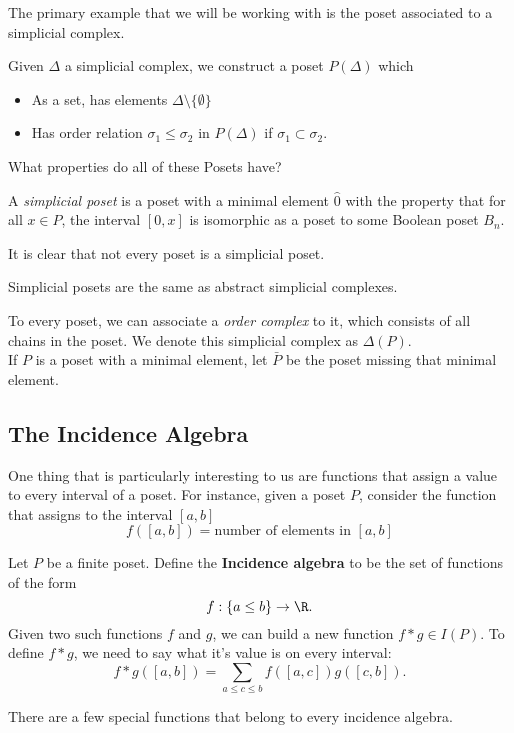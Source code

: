 The primary example that we will be working with is the poset associated to a simplicial complex.
\begin{definition}
 Given $\Delta$ a simplicial complex, we construct a poset $P(\Delta)$ which
 \begin{itemize}
 \item As a set, has elements $\Delta\setminus\{\emptyset\}$
 \item Has order relation  $\sigma_1\leq \sigma_2$ in $P(\Delta)$ if $\sigma_1\subset \sigma_2$. 
 \end{itemize}
\end{definition}

What properties do all of these Posets have?
\begin{definition}
 A \emph{simplicial poset} is a poset with a minimal element $\hat 0$ with the property that for all $x\in P$, the interval $[0, x]$ is isomorphic as a poset to some Boolean poset $B_n$. 
\end{definition}
It is clear that not every poset is a simplicial poset.
\begin{claim}
Simplicial posets are the same as abstract simplicial complexes.
\end{claim}
To every poset, we can associate a \emph{order complex} to it, which consists of all chains in the poset. We denote this simplicial complex as $\Delta(P)$. \\ If $P$ is a poset with a minimal element, let $\bar P$ be the poset missing that minimal element. 



\subsection{The Incidence Algebra}
One thing that is particularly interesting to us are functions that assign a value to every interval of a poset. For instance,  given a poset $P$,  consider the function that assigns to the interval $[a, b]$
\[f([a, b])=\text{number of elements in }[a, b]\]
\begin{definition}
	Let $P$ be a finite poset. Define the \textbf{Incidence algebra} to be the set of functions of the form
	\[f:\{a\leq b\}\to \R.\]
	Given two such functions $f$ and $g$, we can build a new function $f*g\in I(P)$. To define $f*g$,  we need to say what it's value is on every interval:
	\[f*g([a, b])=\sum_{a\leq c\leq b} f([a, c])g([c, b]).\]
\end{definition}
There are a few special functions that belong to every incidence algebra. 

